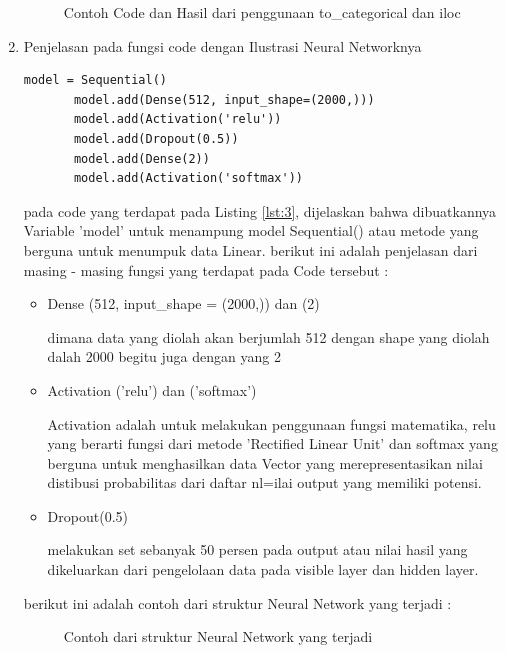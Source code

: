 \begin{enumerate}
\begin{figure}[!htbp]
      \caption{Contoh Code dan Hasil dari penggunaan to\_categorical dan iloc}
      \label{refer9}
\end{figure}

\item Penjelasan pada fungsi code dengan Ilustrasi Neural Networknya
\begin{lstlisting}[caption=Membuat model Neural Network,label={lst:3}]
       model = Sequential()
       model.add(Dense(512, input_shape=(2000,)))
       model.add(Activation('relu'))
       model.add(Dropout(0.5))
       model.add(Dense(2))
       model.add(Activation('softmax'))
\end{lstlisting}
\par pada code yang terdapat pada  Listing \ref{lst:3}, dijelaskan bahwa dibuatkannya Variable 'model' untuk menampung model Sequential() atau metode yang berguna untuk menumpuk data Linear. berikut ini adalah  penjelasan dari masing - masing fungsi yang terdapat pada Code tersebut :
\begin{itemize}
\item Dense (512, input\_shape = (2000,)) dan (2)
\par dimana data yang diolah akan berjumlah 512 dengan shape yang diolah dalah 2000 begitu juga dengan yang 2

\item Activation ('relu') dan ('softmax')
\par Activation adalah untuk melakukan penggunaan fungsi matematika, relu yang berarti fungsi dari metode 'Rectified Linear Unit' dan softmax yang berguna untuk menghasilkan data Vector yang merepresentasikan nilai distibusi probabilitas dari daftar nl=ilai output yang memiliki potensi.

\item Dropout(0.5)
\par melakukan set sebanyak 50 persen pada output atau nilai hasil yang dikeluarkan dari pengelolaan data pada visible layer dan hidden layer.
\end{itemize}
\par berikut ini adalah contoh dari struktur Neural Network yang terjadi :
\begin{figure}[!htbp]
      \caption{Contoh dari struktur Neural Network yang terjadi}
      \label{refer10}
\end{figure}


\end{enumerate}
